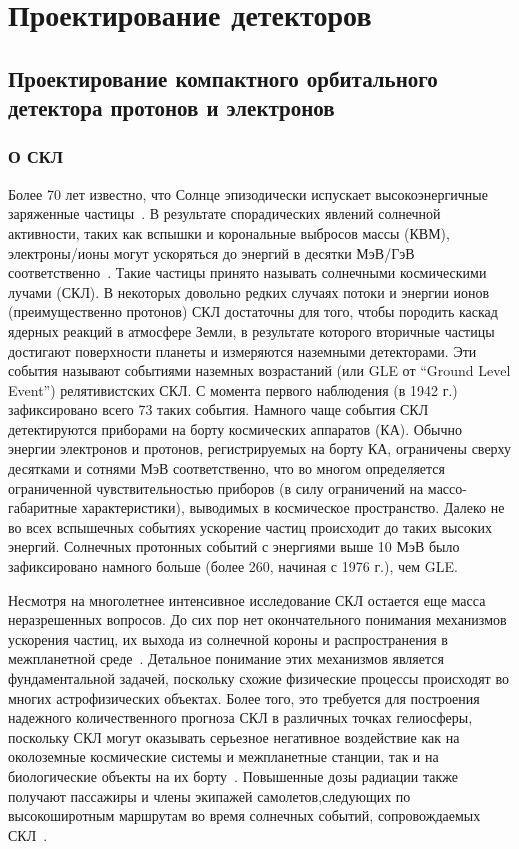 \chapter{Проектирование детекторов}\label{ch:detectors}

\section{Проектирование компактного орбитального детектора протонов и электронов}\label{sec:detectors/satellite}

\subsection{О СКЛ}

Более 70 лет известно, что Солнце эпизодически испускает высокоэнергичные
заряженные частицы~\cite{forbush1946three}. В результате спорадических явлений солнечной активности, таких как вспышки и корональные выбросов массы (КВМ), электроны/ионы могут ускоряться до энергий в десятки МэВ/ГэВ соответственно~\cite{miroshnichenko2015solar}. Такие частицы принято называть солнечными космическими лучами (СКЛ). В некоторых довольно редких случаях потоки и энергии ионов (преимущественно протонов) СКЛ достаточны для того, чтобы породить каскад ядерных реакций в атмосфере Земли, в результате которого вторичные частицы достигают поверхности планеты и измеряются наземными детекторами. Эти события называют событиями наземных возрастаний (или GLE от “Ground Level Event”) релятивистских СКЛ. С момента первого наблюдения (в 1942 г.) зафиксировано всего 73 таких события. Намного чаще события СКЛ детектируются приборами на борту космических аппаратов (КА). Обычно энергии электронов и протонов, регистрируемых на борту КА, ограничены сверху десятками и сотнями МэВ соответственно, что во многом определяется ограниченной чувствительностью приборов (в силу ограничений на массо-габаритные характеристики), выводимых в космическое пространство. Далеко не во всех вспышечных событиях ускорение частиц происходит до таких высоких энергий. Солнечных протонных событий с энергиями выше 10 МэВ было зафиксировано намного больше (более 260, начиная с 1976 г.), чем GLE.

Несмотря на многолетнее интенсивное исследование СКЛ остается еще масса
неразрешенных вопросов. До сих пор нет окончательного понимания механизмов
ускорения частиц, их выхода из солнечной короны и распространения в межпланетной среде~\cite{miroshnichenko2015solar, lin2011energy}. Детальное понимание этих механизмов является фундаментальной задачей, поскольку схожие физические процессы происходят во многих астрофизических объектах. Более того, это требуется для построения надежного количественного прогноза СКЛ в различных точках гелиосферы, поскольку СКЛ могут оказывать серьезное негативное воздействие как на околоземные космические системы и межпланетные станции, так и на биологические объекты на их борту~\cite{petrukovich2008, hoff2004interplanetary, iucci2005space, hu2009modeling, zeitlin2013measurements}. Повышенные дозы радиации также получают пассажиры и члены экипажей самолетов,следующих по высокоширотным маршрутам во время солнечных событий, сопровождаемых СКЛ~\cite{beck2005tepc}.

